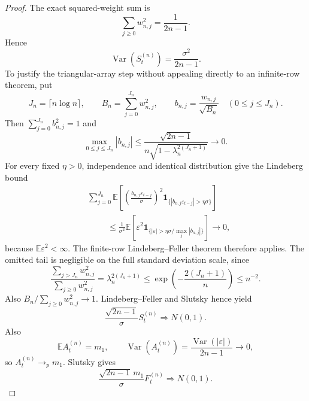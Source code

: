 \documentclass[11pt]{article}
\newcommand{\E}{\mathbb E}
\newcommand{\Var}{\operatorname{Var}}
\begin{document}
\begin{proof}
The exact squared-weight sum is
\begin{equation}
\sum_{j\ge0}w_{n,j}^2=\frac1{2n-1}.
\end{equation}
Hence
\begin{equation}
\Var(S_t^{(n)})=\frac{\sigma^2}{2n-1}.
\end{equation}
To justify the triangular-array step without appealing directly to an
infinite-row theorem, put
\begin{equation}
J_n=\lceil n\log n\rceil,
\qquad
B_n=\sum_{j=0}^{J_n}w_{n,j}^2,
\qquad
b_{n,j}=\frac{w_{n,j}}{\sqrt{B_n}}\quad(0\le j\le J_n).
\end{equation}
Then $\sum_{j=0}^{J_n}b_{n,j}^2=1$ and
\begin{equation}
\max_{0\le j\le J_n}|b_{n,j}|
\le \frac{\sqrt{2n-1}}{n\sqrt{1-\lambda_n^{2(J_n+1)}}}
\longrightarrow0.
\end{equation}
For every fixed $\eta>0$, independence and identical distribution give the
Lindeberg bound
\begin{align}
&\sum_{j=0}^{J_n}
\E\left[
\left(\frac{b_{n,j}\varepsilon_{t-j}}{\sigma}\right)^2
\mathbf 1_{\{|b_{n,j}\varepsilon_{t-j}|>\eta\sigma\}}
\right]\\
&\hspace{1cm}\le
\frac1{\sigma^2}
\E\left[
\varepsilon^2
\mathbf 1_{\{|\varepsilon|>\eta\sigma/\max_j|b_{n,j}|\}}
\right]
\longrightarrow0,
\end{align}
because $\E\varepsilon^2<\infty$.  The finite-row Lindeberg--Feller theorem
therefore applies.  The omitted tail is negligible on the full standard
deviation scale, since
\begin{equation}
\frac{\sum_{j>J_n}w_{n,j}^2}{\sum_{j\ge0}w_{n,j}^2}
=\lambda_n^{2(J_n+1)}
\le \exp\!\left(-\frac{2(J_n+1)}n\right)
\le n^{-2}.
\end{equation}
Also $B_n/\sum_{j\ge0}w_{n,j}^2\to1$.  Lindeberg--Feller and Slutsky hence
yield
\begin{equation}
\frac{\sqrt{2n-1}}{\sigma}S_t^{(n)}\Rightarrow N(0,1).
\end{equation}
Also
\begin{equation}
\E A_t^{(n)}=m_1,
\qquad
\Var(A_t^{(n)})=\frac{\Var(|\varepsilon|)}{2n-1}\to0,
\end{equation}
so $A_t^{(n)}\to_p m_1$. Slutsky gives
\begin{equation}
\frac{\sqrt{2n-1}\,m_1}{\sigma}F_t^{(n)}
\Rightarrow N(0,1).
\end{equation}

\end{proof}
\end{document}
